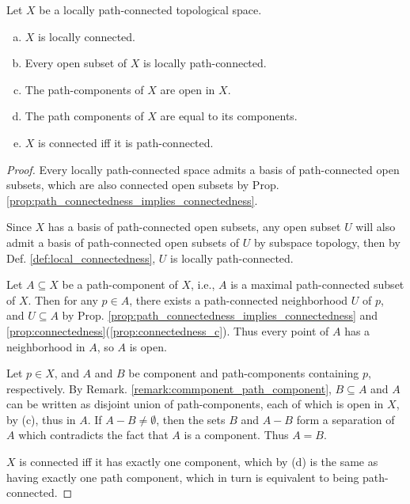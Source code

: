 \documentclass[11pt,a4paper]{article}
\begin{document}
\begin{prop}
Let $X$ be a locally path-connected topological space.
\begin{enumerate}[(a)]
    \item $X$ is locally connected.
    \item Every open subset of $X$ is locally path-connected.
    \item The path-components of $X$ are open in $X$.
    \item The path components of $X$ are equal to its components.
    \item $X$ is connected iff it is path-connected.
\end{enumerate}
\end{prop}

\begin{proof}
 Every locally path-connected space admits a basis of path-connected open subsets, which are also connected open subsets by Prop. \ref{prop:path_connectedness_implies_connectedness}.

 Since $X$ has a basis of path-connected open subsets, any open subset $U$ will also admit a basis of path-connected open subsets of $U$ by subspace topology, then by Def. \ref{def:local_connectedness}, $U$ is locally path-connected.

 Let $A\subseteq X$ be a path-component of $X$, i.e., $A$ is a maximal path-connected subset of $X$. Then for any $p\in A$, there exists a  path-connected neighborhood $U$ of $p$, and $U\subseteq A$ by Prop. \ref{prop:path_connectedness_implies_connectedness} and \ref{prop:connectedness}(\ref{prop:connectedness_c}). Thus every point of $A$ has a neighborhood in $A$, so $A$ is open.

 Let $p\in X$, and $A$ and $B$ be component and path-components containing $p$, respectively. By Remark. \ref{remark:commponent_path_component}, $B\subseteq A$ and $A$ can be written as disjoint union of path-components, each of which is open in $X$, by (c), thus in $A$. If $A-B\neq \emptyset$, then the sets $B$ and $A-B$ form a separation of $A$ which contradicts the fact that $A$ is a component. Thus $A = B$.

 $X$ is connected iff it has exactly one component, which by (d) is the same as having exactly one path component, which in turn is equivalent to being path-connected.
\end{proof}
\end{document}
